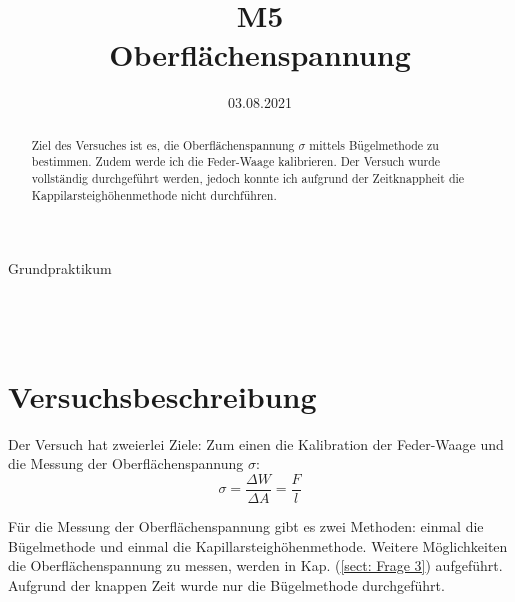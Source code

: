\documentclass[bibliography=totocnumbered]{scrartcl}
\date{03.08.2021}
\title{M5 \\ Oberflächenspannung}
\begin{document}
	\begin{titlepage}
		\begin{center}
			{\huge{Grundpraktikum}}\\\vspace*{15mm}
			{\huge{\textbf{\thetitle}}}\\\vspace*{20mm}
			{\theauthor}\\\vspace*{10mm}
			{\thedate}\\\vspace*{20mm}
			
			\vspace{1.5cm}
			\begin{abstract}
			Ziel des Versuches ist es, die Oberflächenspannung $ \sigma $ mittels Bügelmethode zu bestimmen. Zudem werde ich die Feder-Waage kalibrieren. Der Versuch wurde vollständig durchgeführt werden, jedoch konnte ich aufgrund der Zeitknappheit die Kappilarsteighöhenmethode nicht durchführen.
			
			
			\end{abstract}
			
			
		\end{center}
	\end{titlepage}
	\makeatother
	\restoregeometry
	\newpage
	
	\tableofcontents
	
	
	\listoffigures 
	\listoftables
	\newpage
	
	
	\section{Versuchsbeschreibung}
	Der Versuch hat zweierlei Ziele: Zum einen die Kalibration der Feder-Waage und die Messung der Oberflächenspannung $ \sigma $: 
	\begin{equation}\label{eq: Oberflächenspannung}
		\sigma=\dfrac{\Delta W}{\Delta A}=\dfrac{F}{l}
	\end{equation}
	
	Für die Messung der Oberflächenspannung gibt es zwei Methoden: einmal die Bügelmethode und einmal die Kapillarsteighöhenmethode. Weitere Möglichkeiten die Oberflächenspannung zu messen, werden in Kap. (\ref{sect: Frage 3}) aufgeführt. Aufgrund der knappen Zeit wurde nur die Bügelmethode durchgeführt.
\end{document}
